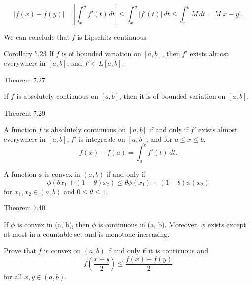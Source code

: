 \documentclass[UTF8,a4paper,10pt]{article}
\begin{document}
\[\left| f(x) - f(y) \right| = \left| \int_{x}^{y} f'(t) \, dt \right| \leq \int_{x}^{y} \left| f'(t) \right| \, dt \leq \int_{x}^{y}  M \, dt = M \left| x - y \right|.
\]

We can conclude that \( f \) is Lipschitz continuous.

\begin{mybox}{Corollary 7.23}
  If \( f \) is of bounded variation on \([a, b]\), then \( f' \) exists almost everywhere in \([a, b]\), and \( f' \in L[a, b] \).
\end{mybox}

\begin{mybox}{Theorem 7.27}

  If \( f \) is absolutely continuous on \([a, b]\), then it is of bounded variation on \([a, b]\).

\end{mybox}


\begin{mybox}{Theorem 7.29}

A function \( f \) is absolutely continuous on \([a, b]\) if and only if \( f' \) exists almost everywhere in \([a, b]\), \( f' \) is integrable on \([a, b]\), and for \( a \leq x \leq b \),
\[
f(x) - f(a) = \int_{a}^{x} f'(t) \, dt.
\]
\end{mybox}

\pagebreak

\begin{mybox}{}
    
  A function \( \phi \) is convex in \( (a, b) \) if and only if
  \[
    \phi(\theta x_1 + (1 - \theta) x_2) \leq \theta \phi(x_1) + (1 - \theta) \phi(x_2)
    \]
    for \( x_1 , x_2 \in (a,b)\) and \( 0 \leq \theta \leq 1 \). 
    
  \end{mybox}

  \begin{mybox}{Theorem 7.40}


 If \(\phi\) is convex in (a, b), then \(\phi\) is continuous in (a, b). Moreover,
\(\phi\) exists except at most in a countable set and is monotone increasing.

\end{mybox}

\begin{Problem}[]{}
  Prove that $f$ is convex on $(a, b)$ if and only if it is continuous and
  \[
  f\left(\frac{x + y}{2}\right) \leq \frac{f(x) + f(y)}{2}
  \]
  for all $x, y \in (a, b)$.
  

\end{Problem}
\end{document}

